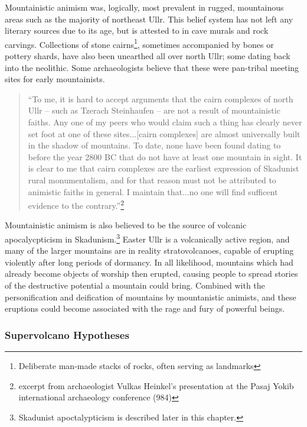 Mountainistic animism was, logically, most prevalent in rugged, mountainous areas such as the majority of northeast Ullr. This belief system has not left any literary sources due to its age, but is attested to in cave murals and rock carvings. Collections of stone cairns\footnote{Deliberate man-made stacks of rocks, often serving as landmarks}, sometimes accompanied by bones or pottery shards, have also been unearthed all over north Ullr; some dating back into the neolithic. Some archaeologists believe that these were pan-tribal meeting sites for early mountainists. \par
\begin{quote}
``To me, it is hard to accept arguments that the cairn complexes of north Ullr -- such as Tzerach Steinhaufen -- are not a result of mountainistic faiths. Any one of my peers who would claim such a thing has clearly never set foot at one of these sites...[cairn complexes] are almost universally built in the shadow of mountains. To date, none have been found dating to before the year 2800 BC that do not have at least one mountain in sight. It is clear to me that cairn complexes are the earliest expression of Skadunist rural monumentalism, and for that reason must not be attributed to animistic faiths in general. I maintain that...no one will find sufficent evidence to the contrary.''\footnote{excerpt from archaeologist Vulkas Heinkel's presentation at the Pasaj Yokib international archaeology conference (984)}
\end{quote}

Mountainistic animism is also believed to be the source of volcanic apocalycpticism in Skadunism.\footnote{Skadunist apoctalypticism is described later in this chapter.} Easter Ullr is a volcanically active region, and many of the larger mountains are in reality stratovolcanoes, capable of erupting violently after long periods of dormancy. In all likelihood, mountains which had already become objects of worship then erupted, causing people to spread stories of the  destructive potential a mountain could bring. Combined with the personification and deification of mountains by mountanistic animists, and these eruptions could become associated with the rage and fury of powerful beings.

\subsubsection{Supervolcano Hypotheses}

